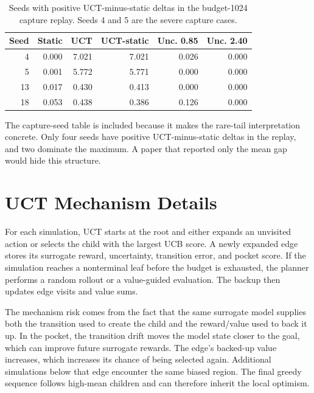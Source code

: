 \documentclass{article}
\begin{document}
\begin{table}[htbp]
\caption{Seeds with positive UCT-minus-static deltas in the budget-1024 capture replay. Seeds 4 and 5 are the severe capture cases.}
\label{tab:capture-seeds}
\begin{center}
\begin{tabular}{rrrrrr}
\toprule
Seed & Static & UCT & UCT-static & Unc. 0.85 & Unc. 2.40 \\
\midrule
4 & 0.000 & 7.021 & 7.021 & 0.026 & 0.000 \\
5 & 0.001 & 5.772 & 5.771 & 0.000 & 0.000 \\
13 & 0.017 & 0.430 & 0.413 & 0.000 & 0.000 \\
18 & 0.053 & 0.438 & 0.386 & 0.126 & 0.000 \\
\bottomrule
\end{tabular}
\end{center}
\end{table}

The capture-seed table is included because it makes the rare-tail interpretation concrete. Only four seeds have positive UCT-minus-static deltas in the replay, and two dominate the maximum. A paper that reported only the mean gap would hide this structure.

\section{UCT Mechanism Details}

For each simulation, UCT starts at the root and either expands an unvisited action or selects the child with the largest UCB score. A newly expanded edge stores its surrogate reward, uncertainty, transition error, and pocket score. If the simulation reaches a nonterminal leaf before the budget is exhausted, the planner performs a random rollout or a value-guided evaluation. The backup then updates edge visits and value sums.

The mechanism risk comes from the fact that the same surrogate model supplies both the transition used to create the child and the reward/value used to back it up. In the pocket, the transition drift moves the model state closer to the goal, which can improve future surrogate rewards. The edge's backed-up value increases, which increases its chance of being selected again. Additional simulations below that edge encounter the same biased region. The final greedy sequence follows high-mean children and can therefore inherit the local optimism.
\end{document}
